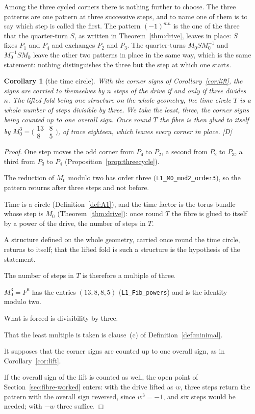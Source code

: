 \documentclass[11pt,a4paper]{article}
\theoremstyle{plain}
\newtheorem{corollary}[theorem]{Corollary}
\theoremstyle{definition}
\theoremstyle{remark}
\newcommand{\rigD}{[\textup{D}]}
\begin{document}
Among the three cycled corners there is nothing further to choose. The three patterns are one pattern at three successive steps, and to name one of them is to say which step is called the first. The pattern $(-1)^{mn}$ is the one of the three that the quarter-turn $S$, as written in Theorem~\ref{thm:drive}, leaves in place: $S$ fixes $P_{1}$ and $P_{4}$ and exchanges $P_{2}$ and $P_{3}$. The quarter-turns $M_{0}SM_{0}^{-1}$ and $M_{0}^{-1}SM_{0}$ leave the other two patterns in place in the same way, which is the same statement: nothing distinguishes the three but the step at which one starts.

\begin{corollary}[the time circle]\label{cor:timecircle}
With the corner signs of Corollary~\ref{cor:lift}, the signs are carried to themselves by $n$ steps of the drive if and only if three divides $n$. The lifted fold being one structure on the whole geometry, the time circle $T$ is a whole number of steps divisible by three. We take the least, three, the corner signs being counted up to one overall sign. Once round $T$ the fibre is then glued to itself by $M_{0}^{3}=\bigl(\begin{smallmatrix}13&8\\8&5\end{smallmatrix}\bigr)$, of trace eighteen, which leaves every corner in place. \rigD
\end{corollary}

\begin{proof}
One step moves the odd corner from $P_{4}$ to $P_{2}$, a second from $P_{2}$ to $P_{3}$, a third from $P_{3}$ to $P_{4}$ (Proposition~\ref{prop:threecycle}).

The reduction of $M_{0}$ modulo two has order three (\texttt{L1\_M0\_mod2\_order3}), so the pattern returns after three steps and not before.

Time is a circle (Definition~\ref{def:A1}), and the time factor is the torus bundle whose step is $M_{0}$ (Theorem~\ref{thm:drive}): once round $T$ the fibre is glued to itself by a power of the drive, the number of steps in $T$.

A structure defined on the whole geometry, carried once round the time circle, returns to itself; that the lifted fold is such a structure is the hypothesis of the statement.

The number of steps in $T$ is therefore a multiple of three.

$M_{0}^{3}=F^{6}$ has the entries $(13,8,8,5)$ (\texttt{L1\_Fib\_powers}) and is the identity modulo two.

What is forced is divisibility by three.

That the least multiple is taken is clause~(c) of Definition~\ref{def:minimal}.

It supposes that the corner signs are counted up to one overall sign, as in Corollary~\ref{cor:lift}.

If the overall sign of the lift is counted as well, the open point of Section~\ref{sec:fibre-worked} enters: with the drive lifted as $w$, three steps return the pattern with the overall sign reversed, since $w^{3}=-1$, and six steps would be needed; with $-w$ three suffice.
\end{proof}
\end{document}
